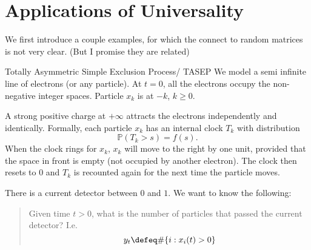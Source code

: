 \section{Applications of Universality}

We first introduce a couple examples, for which the connect to random matrices is not very clear. (But I promise they are related)

\begin{aexample}{Totally Asymmetric Simple Exclusion Process/ TASEP}{}
    We model a semi infinite line of electrons (or any particle). At $t=0$, all the electrons occupy the non-negative integer spaces. Particle $x_k$ is at $-k$, $k\geq 0$.

    \begin{center}
        
    \end{center}

    A strong positive charge at $+\infty$ attracts the electrons independently and identically. Formally, each particle $x_k$ has an internal clock $T_k$ with distribution \[
    \mathbb{P}(T_k> s) = f(s).
    \]
    When the clock rings for $x_k$, $x_k$ will move to the right by one unit, provided that the space in front is empty (not occupied by another electron). The clock then resets to $0$ and $T_k$ is recounted again for the next time the particle moves.
    
    There is a current detector between $0$ and $1$. We want to know the following:
    
    \begin{quote}
        Given time $t>0$, what is the number of particles that passed the current detector? I.e. \[
        y_t \defeq \#\{i:x_i(t)>0\}
        \]
    \end{quote}

\end{aexample}

